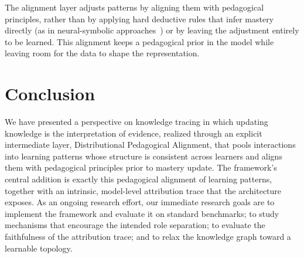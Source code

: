 \documentclass[conference]{IEEEtran}
\begin{document}
The alignment layer adjusts patterns by aligning them with pedagogical principles, rather than by applying hard deductive rules that infer mastery directly (as in neural-symbolic approaches~\cite{hooshyar2026nskt}) or by leaving the adjustment entirely to be learned. This alignment keeps a pedagogical prior in the model while leaving room for the data to shape the representation.

\section{Conclusion}
\label{sec:conclusion}

We have presented a perspective on knowledge tracing in which updating knowledge is the interpretation of evidence, realized through an explicit intermediate layer, Distributional Pedagogical Alignment, that pools interactions into learning patterns whose structure is consistent across learners and aligns them with pedagogical principles prior to mastery update. The framework's central addition is exactly this pedagogical alignment of learning patterns, together with an intrinsic, model-level attribution trace that the architecture exposes. As an ongoing research effort, our immediate research goals are to implement the framework and evaluate it on standard benchmarks; to study mechanisms that encourage the intended role separation; to evaluate the faithfulness of the attribution trace; and to relax the knowledge graph toward a learnable topology.



\end{document}
